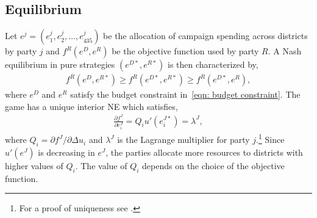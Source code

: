 \documentclass[12pt,final,fleqn]{article}
\theoremstyle{plain}
\begin{document}
\subsection{Equilibrium} \label{sec: equilibrium}
Let $e^j = (e_1^j, e_2^j, \ldots, e_{435}^j)$ be the allocation of campaign spending across districts by party $j$ and $f^R(e^D, e^R)$ be the objective function used by party $R$. A Nash equilibrium in pure strategies $(e^{D*}, e^{R*})$ is then characterized by,
\begin{align}
f^R(e^D, e^{R*}) \geq f^R(e^{D*}, e^{R*}) \geq f^R(e^{D*}, e^{R}),
\end{align}
where $e^D$ and $e^R$ satisfy the budget constraint in~\autoref{eqn: budget constraint}. The game has a unique interior NE which satisfies,
\begin{align}
\frac{\partial f^J}{\partial e_i^J}= Q_i u'(e^{J*}_i)=\lambda^J,
\end{align}
where $Q_i = \partial f^J/ \partial \Delta u_i$ and $\lambda^J$ is the Lagrange multiplier for party $j$.\footnote{For a proof of uniqueness see \citet{stromberg2008electoral}.} Since $u'(e^J)$ is decreasing in $e^J$, the parties allocate more resources to districts with higher values of $Q_i$. The value of $Q_i$ depends on the choice of the objective function.
\end{document}
